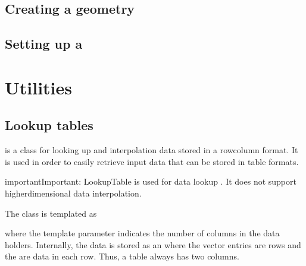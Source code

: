 \documentclass[letterpaper,10pt,english]{sphinxmanual}
\begin{document}
\section{Creating a geometry}
\label{\detokenize{Tutorials/Tutorial:creating-a-geometry}}

\section{Setting up a }
\label{\detokenize{Tutorials/Tutorial:setting-up-a-timestepper}}

\chapter{Utilities}
\label{\detokenize{index:utilities}}

\section{Lookup tables}
\label{\detokenize{Utilities/LookupTable:lookup-tables}}\label{\detokenize{Utilities/LookupTable:chap-lookuptable}}\label{\detokenize{Utilities/LookupTable::doc}}
 is a class for looking up and interpolation data stored in a row\sphinxhyphen{}column format.
It is used in order to easily retrieve input data that can be stored in table formats.

\begin{sphinxadmonition}{important}{Important:}
LookupTable is used for data lookup .
It does not support higher\sphinxhyphen{}dimensional data interpolation.
\end{sphinxadmonition}

The class is templated as

\begin{sphinxVerbatim}[commandchars=\\\{\},formatcom=\scriptsize]
  
 
\end{sphinxVerbatim}

where the template parameter  indicates the number of columns in the data holders.
Internally, the data is stored as an  where the vector entries are rows and the  are data in each row.
Thus, a table  always has two columns.
\end{document}
